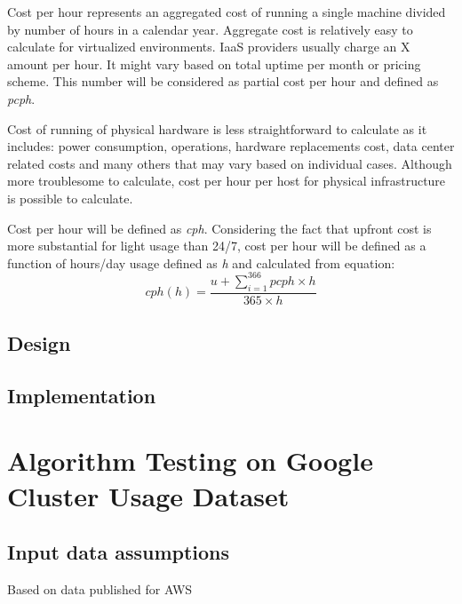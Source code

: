 \documentclass[]{final_report}
\begin{document}
Cost per hour represents an aggregated cost of running a single machine divided by number of hours in a calendar year. Aggregate cost is relatively easy to calculate for virtualized environments. IaaS providers usually charge an X amount per hour. It might vary based on total uptime per month or pricing scheme. This number will be considered as partial cost per hour and defined as \textit{pcph}. \par
Cost of running of physical hardware is less straightforward to calculate as it includes: power consumption, operations, hardware replacements cost, data center related costs and many others that may vary based on individual cases. Although more troublesome to calculate, cost per hour per host for physical infrastructure is possible to calculate. \par
Cost per hour will be defined as \textit{cph}. Considering the fact that upfront cost is more substantial for light usage than 24/7, cost per hour will be defined as a function of hours/day usage defined as \textit{h} and calculated from equation:
\begin{equation}
cph(h) = \frac{u + \sum_{i=1}^{366} pcph \times h}{365 \times h}
\end{equation}
\section{Design}
\section{Implementation}


\chapter{Algorithm Testing on Google Cluster Usage Dataset}

\section{Input data assumptions} 

Based on data published for AWS~\cite{AWS:2014} 

\end{document}
